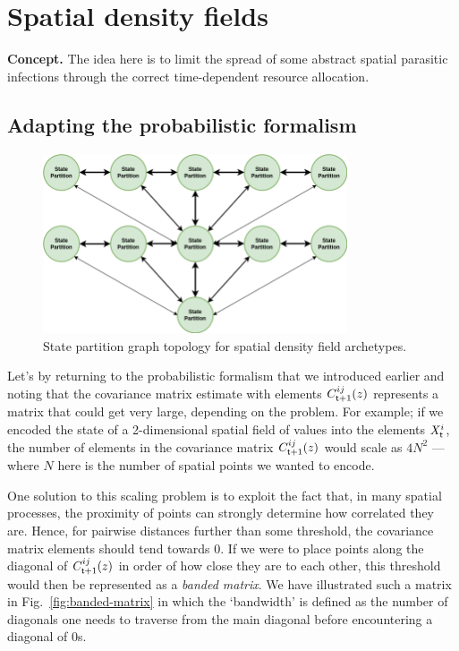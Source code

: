 \chapter{\sffamily Spatial density fields}

{\bfseries\sffamily Concept.} The idea here is to limit the spread of some abstract spatial parasitic infections through the correct time-dependent resource allocation.

\section{\sffamily Adapting the probabilistic formalism}

\begin{figure}[h]
\centering
\includegraphics[width=9cm]{images/chapter-7-state-partition-graph.drawio.png}
\caption{State partition graph topology for spatial density field archetypes.}
\label{fig:state-partition-graph-spatial-density-fields}
\end{figure}

Let's by returning to the probabilistic formalism that we introduced earlier and noting that the covariance matrix estimate with elements $C^{ij}_{{\sf t}+1}(z)$ represents a matrix that could get very large, depending on the problem. For example; if we encoded the state of a 2-dimensional spatial field of values into the elements $X^i_{\sf t}$, the number of elements in the covariance matrix $C^{ij}_{{\sf t}+1}(z)$ would scale as $4N^2$ --- where $N$ here is the number of spatial points we wanted to encode. 

One solution to this scaling problem is to exploit the fact that, in many spatial processes, the proximity of points can strongly determine how correlated they are. Hence, for pairwise distances further than some threshold, the covariance matrix elements should tend towards 0. If we were to place points along the diagonal of $C^{ij}_{{\sf t}+1}(z)$ in order of how close they are to each other, this threshold would then be represented as a \emph{banded matrix}. We have illustrated such a matrix in Fig.~\ref{fig:banded-matrix} in which the `bandwidth' is defined as the number of diagonals one needs to traverse from the main diagonal before encountering a diagonal of 0s.

